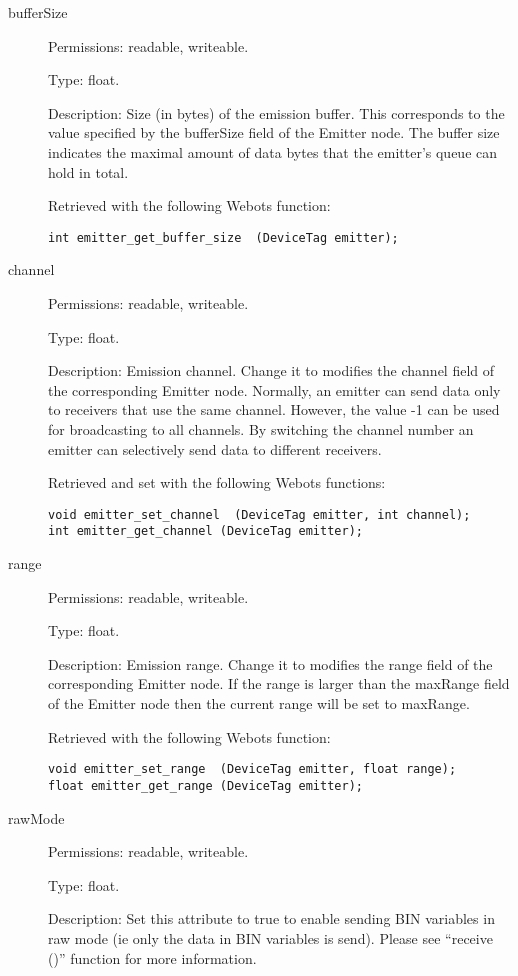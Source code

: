 \noindent
\begin{description}
\item[{         bufferSize
  }]            Permissions: readable, writeable.


  Type: float.


  Description: Size (in bytes) of the emission buffer. This
  corresponds to the value specified by the bufferSize field of the
  Emitter node. The buffer size indicates the maximal amount of data
  bytes that the emitter's queue can hold in total.


  Retrieved with the following Webots function:


\begin{lstlisting}
int emitter_get_buffer_size  (DeviceTag emitter);
\end{lstlisting}
\item[{         channel
  }]            Permissions: readable, writeable.


  Type: float.


  Description: Emission channel. Change it to modifies the channel
  field of the corresponding Emitter node. Normally, an emitter can
  send data only to receivers that use the same channel. However, the
  value -{}1 can be used for broadcasting to all channels. By
  switching the channel number an emitter can selectively send data to
  different receivers.


  Retrieved and set with the following Webots functions:


\begin{lstlisting}
void emitter_set_channel  (DeviceTag emitter, int channel);
int emitter_get_channel (DeviceTag emitter);
\end{lstlisting}
\item[{         range
 }]            Permissions: readable, writeable.


 Type: float.


 Description: Emission range. Change it to modifies the range field of
 the corresponding Emitter node. If the range is larger than the
 maxRange field of the Emitter node then the current range will be set
 to maxRange.


          Retrieved with the following Webots function:


\begin{lstlisting}
void emitter_set_range  (DeviceTag emitter, float range);
float emitter_get_range (DeviceTag emitter);
\end{lstlisting}
\item[{         rawMode
 }]            Permissions: readable, writeable.


 Type: float.


 Description: Set this attribute to true to enable sending BIN
 variables in raw mode (ie only the data in BIN variables is
 send). Please see ``receive ()'' function for more information.

\end{description}

